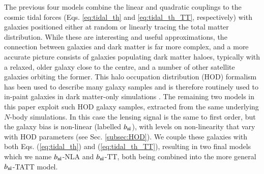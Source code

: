 The previous four models combine the linear and quadratic couplings to the cosmic tidal forces  (Eqs. \ref{eq:tidal_th} and \ref{eq:tidal_th_TT}, respectively) with galaxies positioned  either at random or linearly tracing the total matter distribution.
While these are interesting and useful approximations, the connection between galaxies and dark matter is far more complex, and a more accurate picture consists of galaxies populating dark matter haloes, typically with a relaxed, older galaxy close to the centre, and a number of other satellite galaxies orbiting the former.
This halo occupation distribution (HOD) formalism has been used to describe many galaxy samples \citep[\eg][]{SDSS-HOD, BOSS-HOD, GAMA-HOD, DESI-HOD} and is therefore routinely used to in-paint galaxies in dark matter-only simulations \citep{MICE-HOD, SLICS-HOD,  Abbacus-HOD, Balrog}.
The remaining two models in this paper exploit such HOD galaxy samples, extracted from the same underlying $N$-body simulations. In this case the lensing signal is the same to first order, but the galaxy bias is non-linear (labelled $b_{\rm nl}$), with levels on non-linearity that vary with HOD parameters (see Sec. \ref{subsec:HOD}).
We couple these galaxies with both Eqs. (\ref{eq:tidal_th}) and (\ref{eq:tidal_th_TT}), resulting in two final models which we name  $b_{\rm nl}$-NLA and  $b_{\rm nl}$-TT, both being combined into the more general  $b_{\rm nl}$-TATT model.



